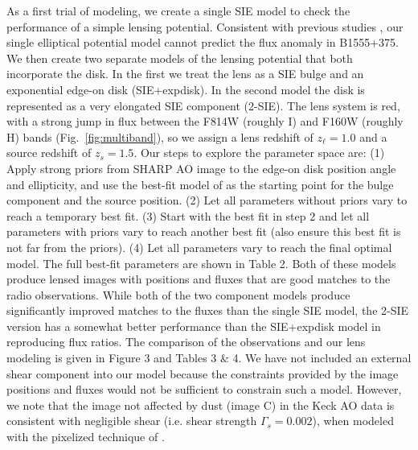 \documentclass[useAMS,usenatbib]{mn2e}
\begin{document}
As a first trial of modeling, we create a single SIE model to check
the performance of a simple lensing potential. Consistent with
previous studies \citep{Marlow99, Xu14}, our single elliptical
potential model cannot predict the flux anomaly in B1555+375.  We then
create two separate models of the lensing potential that both
incorporate the disk.  In the first we treat the lens as a SIE bulge
and an exponential edge-on disk (SIE+expdisk).  In the second model
the disk is represented as a very elongated SIE component (2-SIE).
The lens system is red, with a strong jump in flux between the F814W
(roughly I) and F160W (roughly H) bands (Fig.~\ref{fig:multiband}), so
we assign a lens redshift of $z_\ell = 1.0$ and a source redshift of
$z_s =1.5$. Our steps to explore the parameter space are: (1) Apply
strong priors from SHARP AO image to the edge-on disk position angle
and ellipticity, and use the best-fit model of \citet{Marlow99} as the
starting point for the bulge component and the source position. (2)
Let all parameters without priors vary to reach a temporary best
fit. (3) Start with the best fit in step 2 and let all parameters with
priors vary to reach another best fit (also ensure this best fit is
not far from the priors). (4) Let all parameters vary to reach the
final optimal model.  The full best-fit parameters are shown in Table
2. Both of these models produce lensed images with positions and
fluxes that are good matches to the radio observations.  While both of
the two component models produce significantly improved matches to the
fluxes than the single SIE model, the 2-SIE version has a somewhat
better performance than the SIE+expdisk model in reproducing flux
ratios. The comparison of the observations and our lens modeling is
given in Figure 3 and Tables 3 \& 4.  We have not included an external
shear component into our model because the constraints provided by the
image positions and fluxes would not be sufficient to constrain such a
model. However, we note that the image not affected by dust (image C)
in the Keck AO data is consistent with negligible shear (i.e. shear
strength $\Gamma_s=0.002$), when modeled with the pixelized technique
of \citet{V09}.
\end{document}
